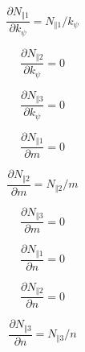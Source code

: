 \documentclass[a4paper,12pt]{article}%
\begin{document}
\begin{equation}
\frac{\partial N_{\Vert1}}{\mathcal{\partial}k_{\psi}}=N_{\Vert1}/k_{\psi}%
\end{equation}
%

\begin{equation}
\frac{\partial N_{\Vert2}}{\mathcal{\partial}k_{\psi}}=0
\end{equation}
%

\begin{equation}
\frac{\partial N_{\Vert3}}{\mathcal{\partial}k_{\psi}}=0
\end{equation}
%

\begin{equation}
\frac{\partial N_{\Vert1}}{\mathcal{\partial}m}=0
\end{equation}
%

\begin{equation}
\frac{\partial N_{\Vert2}}{\mathcal{\partial}m}=N_{\Vert2}/m
\end{equation}
%

\begin{equation}
\frac{\partial N_{\Vert3}}{\mathcal{\partial}m}=0
\end{equation}
%

\begin{equation}
\frac{\partial N_{\Vert1}}{\mathcal{\partial}n}=0
\end{equation}
%

\begin{equation}
\frac{\partial N_{\Vert2}}{\mathcal{\partial}n}=0
\end{equation}
%

\begin{equation}
\frac{\partial N_{\Vert3}}{\mathcal{\partial}n}=N_{\Vert3}/n
\end{equation}
\end{document}
